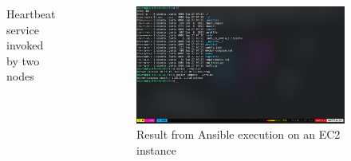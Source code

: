 \documentclass{beamer}
\begin{document}
    	\begin{frame}
    	
    	\begin{columns}
    	\begin{figure}
          \centering
          
          \caption{Heartbeat service invoked by two nodes}
        \end{figure}
        
    	
    	 \begin{figure}
    	 \centering
	  \includegraphics[width=\textwidth]{images/aws_demo.png}
	  \caption{Result from Ansible execution on an EC2 instance}
	 \end{figure}
    
    	
        \end{columns}
	 \end{frame}
	
\end{document}
